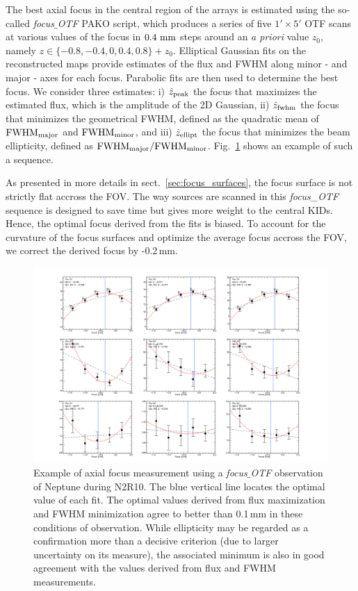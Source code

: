 The best axial focus in the central region of the arrays is estimated using the
so-called \emph{focus$\_$OTF} PAKO script, which produces a series of five $1'
\times 5'$ OTF scans at various values of the focus in $0.4~\rm{mm}$ steps
around an \emph{a priori} value $z_0$, namely $z \in \{-0.8, -0.4, 0, 0.4, 0.8\}
+ z_0$. Elliptical Gaussian fits on the reconstructed maps provide estimates of
the flux and FWHM along minor - and major - axes for each focus. Parabolic fits are
then used to determine the best focus. We consider three estimates: i) $\hat
z_{\rm{peak}}$ the focus that maximizes the estimated flux, which is the
amplitude of the 2D Gaussian, ii) $\hat z_{\rm{fwhm}}$ the focus that minimizes
the geometrical FWHM, defined as the quadratic mean of $\rm{FWHM}_{\rm{major}}$
and $\rm{FWHM}_{\rm{minor}}$, and iii) $\hat z_{\rm{ellipt}}$ the focus that
minimizes the beam ellipticity, defined as
$\rm{FWHM}_{\rm{major}}/\rm{FWHM}_{\rm{minor}}$. Fig.~\ref{fig:focus-example}
shows an example of such a sequence.

As presented in more details in sect.~\ref{sec:focus_surfaces}, the focus
surface is not strictly flat accross the FOV. The way sources are scanned in
this \emph{focus\_OTF} sequence is designed to save time but gives more weight
to the central KIDs. Hence, the optimal focus derived from the fits is
biased. To account for the curvature of the focus surfaces and optimize the
average focus accross the FOV, we correct the derived focus by -0.2\,mm.

\begin{figure}[hhh]
\begin{center}
  \includegraphics[clip, angle=0, scale=0.25]{Figures/plot_20170419s143.png}
\caption[Axial focus measure]{Example of axial focus measurement using a
  \emph{focus$\_$OTF} observation of Neptune during N2R10. The blue vertical line
  locates the optimal value of each fit. The optimal values derived from flux
  maximization and FWHM minimization agree to better than 0.1\,mm in these
  conditions of observation. While ellipticity may be regarded as a confirmation
  more than a decisive criterion (due to larger uncertainty on its measure), the
  associated minimum is also in good agreement with the values derived from flux
  and FWHM measurements.}
\label{fig:focus-example}
\end{center}
\end{figure}


